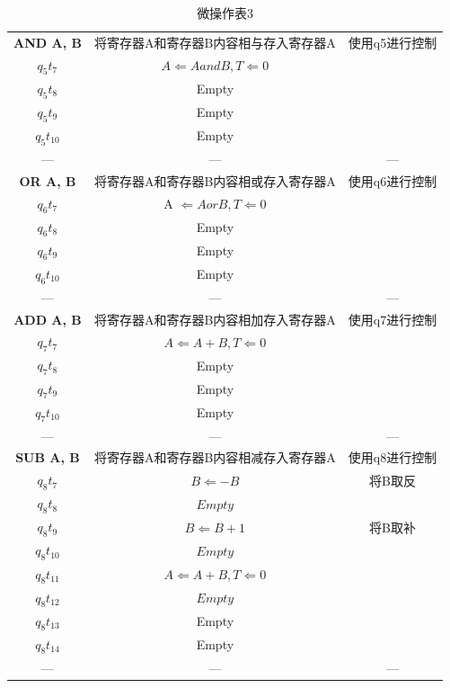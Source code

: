 \documentclass[UTF8]{ctexart}
\begin{document}
    \begin{table}[!htb]
      \begin{tabular}{|c|c|c|}
        \hline
        \textbf{AND A, B }& 将寄存器A和寄存器B内容相与存入寄存器A & 使用q5进行控制 \\
        $q_5t_7$ & $A \Leftarrow A and B , T \Leftarrow 0 $& \\
        $q_5t_8$ & Empty & \\
        $q_5t_9$ & Empty & \\
        $q_5t_{10}$ & Empty & \\
        ---&---&---\\
        \hline
        \textbf{OR A, B }& 将寄存器A和寄存器B内容相或存入寄存器A  & 使用q6进行控制 \\
        $q_6t_7$ & A $\Leftarrow A or B , T \Leftarrow 0$ & \\
        $q_6t_8$ & Empty & \\
        $q_6t_9$ & Empty & \\
        $q_6t_{10}$ & Empty & \\
        ---&---&---\\
        \hline
        \textbf{ADD A, B }& 将寄存器A和寄存器B内容相加存入寄存器A  & 使用q7进行控制\\
        $q_7t_7$ & $A \Leftarrow A + B , T \Leftarrow 0$ & \\
        $q_7t_8$ & Empty & \\
        $q_7t_9$ & Empty & \\
        $q_7t_{10}$ & Empty & \\
        ---&---&---\\
        \hline
        \textbf{SUB A, B }& 将寄存器A和寄存器B内容相减存入寄存器A  & 使用q8进行控制 \\
        $q_8t_7$ & $B \Leftarrow -B$ & 将B取反\\
        $q_8t_8$ & $Empty$ & \\
        $q_8t_9$ & $B \Leftarrow B + 1$ & 将B取补\\
        $q_8t_{10}$ & $Empty$ & \\
        $q_8t_{11}$ & $A \Leftarrow A + B , T \Leftarrow 0 $& \\
        $q_8t_{12}$ & $Empty$ & \\
        $q_8t_{13}$ & Empty & \\
        $q_8t_{14}$ & Empty & \\
        ---&---&---\\
        \hline
      \end{tabular}
      \caption{微操作表3}\label{微操作表3}
    \end{table}
    \newpage
\end{document}
